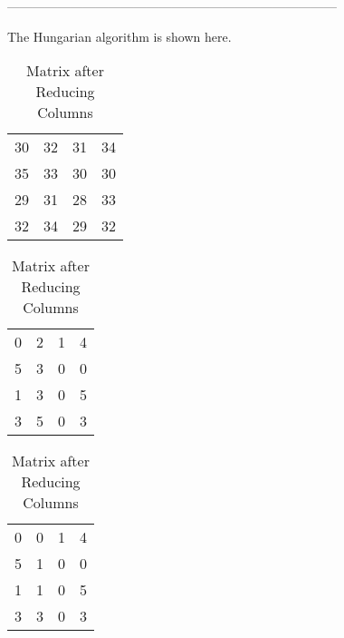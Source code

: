 ------------------------------------------------------------------------------
%
%
%

\begin{subquestions}
	
	\subquestion
	
	\begin{subsubquestions}
		
		\subsubquestion
		
		The Hungarian algorithm is shown here.
		
		\begin{table}[!hbt]
			\begin{minipage}{0.3\textwidth}
				\centering
				\begin{tabular}{cccc}
					30 & 32 & 31 & 34 \\
					35 & 33 & 30 & 30 \\
					29 & 31 & 28 & 33 \\
					32 & 34 & 29 & 32 \\
				\end{tabular}
				\captionsetup{width=1.1\linewidth}
				\caption*{Matrix From question}
			\end{minipage}
			\hspace{20pt}
			\begin{minipage}{0.3\textwidth}
				\centering
				\begin{tabular}{cccc}
					0 & 2 & 1 & 4 \\
					5 & 3 & 0 & 0 \\
					1 & 3 & 0 & 5 \\
					3 & 5 & 0 & 3 \\
				\end{tabular}
				\captionsetup{width=1.1\linewidth}
				\caption*{Matrix after Reducing Rows}
			\end{minipage}
			\hspace{20pt}
			\begin{minipage}{0.3\textwidth}
				\centering
				\begin{tabular}{cccc}
					0 & 0 & 1 & 4 \\
					5 & 1 & 0 & 0 \\
					1 & 1 & 0 & 5 \\
					3 & 3 & 0 & 3 \\
				\end{tabular}
				\captionsetup{width=1.1\linewidth}
				\caption*{Matrix after Reducing Columns} 
			\end{minipage}
			

\end{table}
\end{subsubquestions}
\end{subquestions}
